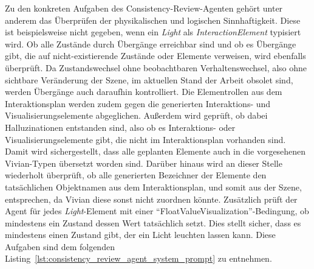 Zu den konkreten Aufgaben des Consistency-Review-Agenten gehört unter anderem das Überprüfen der physikalischen und logischen Sinnhaftigkeit. Diese ist beispielsweise nicht gegeben, wenn ein \textit{Light} als \textit{InteractionElement} typisiert wird. Ob alle Zustände durch Übergänge erreichbar sind und ob es Übergänge gibt, die auf nicht-existierende Zustände oder Elemente verweisen, wird ebenfalls überprüft. Da Zustandswechsel ohne beobachtbaren Verhaltenswechsel, also ohne sichtbare Veränderung der Szene, im aktuellen Stand der Arbeit obsolet sind, werden Übergänge auch daraufhin kontrolliert. Die Elementrollen aus dem Interaktionsplan werden zudem gegen die generierten Interaktions- und Visualisierungselemente abgeglichen. Außerdem wird geprüft, ob dabei Halluzinationen entstanden sind, also ob es Interaktions- oder Visualisierungselemente gibt, die nicht im Interaktionsplan vorhanden sind. Damit wird sichergestellt, dass alle geplanten Elemente auch in die vorgesehenen Vivian-Typen übersetzt worden sind. Darüber hinaus wird an dieser Stelle wiederholt überprüft, ob alle generierten Bezeichner der Elemente den tatsächlichen Objektnamen aus dem Interaktionsplan, und somit aus der Szene, entsprechen, da Vivian diese sonst nicht zuordnen könnte. Zusätzlich prüft der Agent für jedes \textit{Light}-Element mit einer \enquote{FloatValueVisualization}-Bedingung, ob mindestens ein Zustand dessen Wert tatsächlich setzt. Dies stellt sicher, dass es mindestens einen Zustand gibt, der ein Licht leuchten lassen kann. Diese Aufgaben sind dem folgenden Listing~\ref{lst:consistency_review_agent_system_prompt} zu entnehmen.

